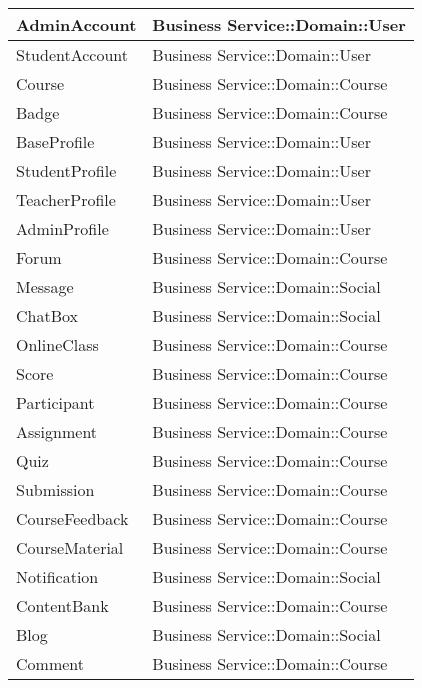 \documentclass[./../main_file.tex]{subfiles}
\begin{document}
\begin{longtable}{|p{.5\linewidth}|p{.5\linewidth}|}
		AdminAccount             & Business Service::Domain::User                \\ \hline
		StudentAccount           & Business Service::Domain::User                \\ \hline
		Course                   & Business Service::Domain::Course              \\ \hline
		Badge                    & Business Service::Domain::Course              \\ \hline
		BaseProfile              & Business Service::Domain::User                \\ \hline
		StudentProfile           & Business Service::Domain::User                \\ \hline
		TeacherProfile           & Business Service::Domain::User                \\ \hline
		AdminProfile             & Business Service::Domain::User                \\ \hline
		Forum                    & Business Service::Domain::Course              \\ \hline
		Message                  & Business Service::Domain::Social              \\ \hline
		ChatBox                  & Business Service::Domain::Social              \\ \hline
		OnlineClass              & Business Service::Domain::Course              \\ \hline
		Score                    & Business Service::Domain::Course              \\ \hline
		Participant              & Business Service::Domain::Course              \\ \hline
		Assignment               & Business Service::Domain::Course              \\ \hline
		Quiz                     & Business Service::Domain::Course              \\ \hline
		Submission               & Business Service::Domain::Course              \\ \hline
		CourseFeedback           & Business Service::Domain::Course              \\ \hline
		CourseMaterial           & Business Service::Domain::Course              \\ \hline
		Notification             & Business Service::Domain::Social              \\ \hline
		ContentBank              & Business Service::Domain::Course              \\ \hline
		Blog                     & Business Service::Domain::Social              \\ \hline
		Comment                  & Business Service::Domain::Course              \\ \hline
	\end{longtable}
\end{document}
